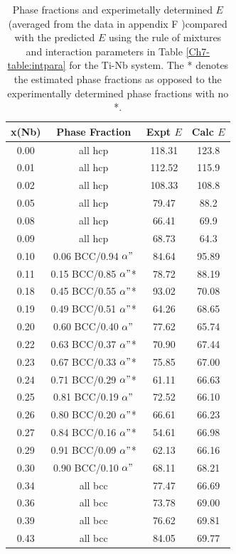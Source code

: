 \newpage
\begin{table}[H]
	\caption{Phase fractions and experimetally determined $E$ (averaged from the data in appendix F \cite{Friak2012,Timoshevskii2011,Friak2012,Karre2015})compared with the predicted $E$ using the rule of mixtures and interaction parameters in Table \ref{Ch7-table:intpara} for the Ti-Nb system. The * denotes the estimated phase fractions as opposed to the experimentally determined phase fractions with no *.}
	\centering
	\begin{tabular}{ c c c c}
		\hline
		x(Nb) & Phase Fraction & Expt $E$ & Calc $E$\\
		\hline
		0.00 & all hcp & 118.31 & 123.8\\
		0.01 & all hcp & 112.52 & 115.9\\
		0.02 & all hcp & 108.33 & 108.8\\
		0.05 & all hcp & 79.47 & 88.2\\
		0.08 & all hcp & 66.41 & 69.9\\
		0.09 & all hcp & 68.73 & 64.3\\
		0.10 & 0.06 BCC/0.94 $\alpha"$ & 84.64 & 95.89\\
		0.11 & 0.15 BCC/0.85 $\alpha"$* & 78.72 & 88.19\\
		0.18 & 0.45 BCC/0.55 $\alpha"$* & 93.02 & 70.08\\
		0.19 & 0.49 BCC/0.51 $\alpha"$* & 64.26 & 68.65\\
		0.20 & 0.60 BCC/0.40 $\alpha"$ & 77.62 & 65.74\\
		0.22 & 0.63 BCC/0.37 $\alpha"$* & 70.90 & 67.44\\
		0.23 & 0.67 BCC/0.33 $\alpha"$* & 75.85 & 67.00\\
		0.24 & 0.71 BCC/0.29 $\alpha"$* & 61.11 & 66.63\\
		0.25 & 0.81 BCC/0.19 $\alpha"$ & 72.52 & 66.10\\
		0.26 & 0.80 BCC/0.20 $\alpha"$* & 66.61 & 66.23\\
		0.27 & 0.84 BCC/0.16 $\alpha"$* & 54.61 & 66.98\\
		0.29 & 0.91 BCC/0.09 $\alpha"$* & 62.13 & 66.16\\
		0.30 & 0.90 BCC/0.10 $\alpha"$ & 68.11 & 68.21\\
		0.34 & all bcc & 77.47 & 66.69\\
		0.36 & all bcc & 73.78 & 69.00\\
		0.39 & all bcc & 76.62 & 69.81\\
		0.43 & all bcc & 84.05 & 69.77\\
		\hline
	\end{tabular}
	\label{Ch7-table:elasexptdata}
\end{table}
\clearpage

